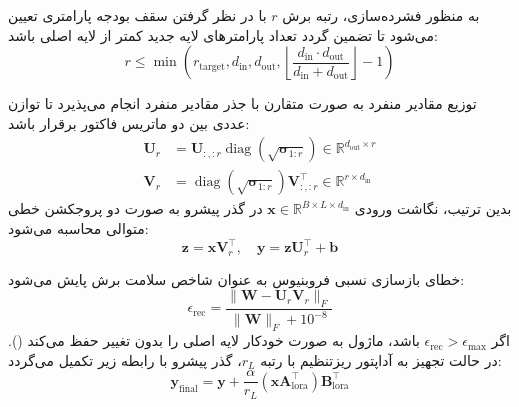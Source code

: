 به منظور فشرده‌سازی، رتبه برش $r$ با در نظر گرفتن سقف بودجه پارامتری تعیین می‌شود تا تضمین گردد تعداد پارامترهای لایه جدید کمتر از لایه اصلی باشد:
\begin{equation}
r \le \min \left( r_{\text{target}}, d_{\text{in}}, d_{\text{out}}, \left\lfloor \frac{d_{\text{in}} \cdot d_{\text{out}}}{d_{\text{in}} + d_{\text{out}}} \right\rfloor - 1 \right)
\end{equation}

توزیع مقادیر منفرد به صورت متقارن با جذر مقادیر منفرد انجام می‌پذیرد تا توازن عددی بین دو ماتریس فاکتور برقرار باشد:
\begin{align}
\mathbf{U}_r &= \mathbf{U}_{:, :r} \operatorname{diag}(\sqrt{\mathbf{\sigma}_{1:r}}) \in \mathbb{R}^{d_{\text{out}} \times r} \\
\mathbf{V}_r &= \operatorname{diag}(\sqrt{\mathbf{\sigma}_{1:r}}) \mathbf{V}_{:, :r}^\top \in \mathbb{R}^{r \times d_{\text{in}}}
\end{align}
بدین ترتیب، نگاشت ورودی $\mathbf{x} \in \mathbb{R}^{B \times L \times d_{\text{in}}}$ در گذر پیشرو به صورت دو پروجکشن خطی متوالی محاسبه می‌شود:
\begin{equation}
\mathbf{z} = \mathbf{x} \mathbf{V}_r^\top, \quad \mathbf{y} = \mathbf{z} \mathbf{U}_r^\top + \mathbf{b}
\end{equation}

خطای بازسازی نسبی فروبنیوس به عنوان شاخص سلامت برش پایش می‌شود:
\begin{equation}
\epsilon_{\text{rec}} = \frac{\|\mathbf{W} - \mathbf{U}_r \mathbf{V}_r\|_F}{\|\mathbf{W}\|_F + 10^{-8}}
\end{equation}
اگر $\epsilon_{\text{rec}} > \epsilon_{\text{max}}$ باشد، ماژول به صورت خودکار لایه اصلی را بدون تغییر حفظ می‌کند (). در حالت تجهیز به آداپتور ریزتنظیم  با رتبه $r_L$، گذر پیشرو با رابطه زیر تکمیل می‌گردد:
\begin{equation}
\mathbf{y}_{\text{final}} = \mathbf{y} + \frac{\alpha}{r_L} (\mathbf{x} \mathbf{A}_{\text{lora}}^\top) \mathbf{B}_{\text{lora}}^\top
\end{equation}

